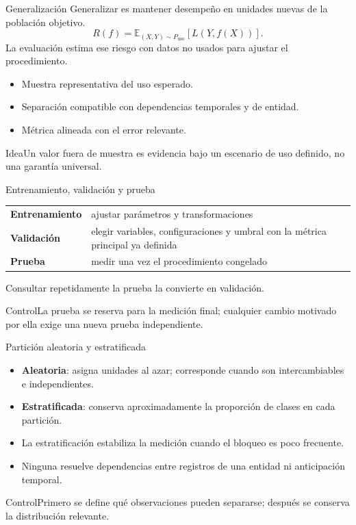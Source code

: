 \documentclass[aspectratio=169,10pt]{beamer}
\newcommand{\concepto}[1]{\textcolor{UAPTeal}{\textbf{#1}}}
\begin{document}
\begin{frame}{Generalización}
  \small Generalizar es mantener desempeño en unidades nuevas de la población objetivo.
  \[R(f)=\mathbb{E}_{(X,Y)\sim P_{\mathrm{uso}}}[L(Y,f(X))].\]
  La evaluación estima ese riesgo con datos no usados para ajustar el procedimiento.
  \begin{itemize}
    \item Muestra representativa del uso esperado.
    \item Separación compatible con dependencias temporales y de entidad.
    \item Métrica alineada con el error relevante.
  \end{itemize}
  \begin{block}{Idea}Un valor fuera de muestra es evidencia bajo un escenario de uso definido, no una garantía universal.\end{block}
\end{frame}

\begin{frame}{Entrenamiento, validación y prueba}
  \small
  \begin{tabularx}{\textwidth}{>{\bfseries}p{}X}\toprule
  Entrenamiento & ajustar parámetros y transformaciones\\
  Validación & elegir variables, configuraciones y umbral con la métrica principal ya definida\\
  Prueba & medir una vez el procedimiento congelado\\\bottomrule
  \end{tabularx}
  Consultar repetidamente la prueba la convierte en validación.
  \begin{alertblock}{Control}La prueba se reserva para la medición final; cualquier cambio motivado por ella exige una nueva prueba independiente.\end{alertblock}
\end{frame}

\begin{frame}{Partición aleatoria y estratificada}
  \small
  \begin{itemize}
    \item \concepto{Aleatoria}: asigna unidades al azar; corresponde cuando son intercambiables e independientes.
    \item \concepto{Estratificada}: conserva aproximadamente la proporción de clases en cada partición.
    \item La estratificación estabiliza la medición cuando el bloqueo es poco frecuente.
    \item Ninguna resuelve dependencias entre registros de una entidad ni anticipación temporal.
  \end{itemize}
  \begin{alertblock}{Control}Primero se define qué observaciones pueden separarse; después se conserva la distribución relevante.\end{alertblock}
\end{frame}
\end{document}
